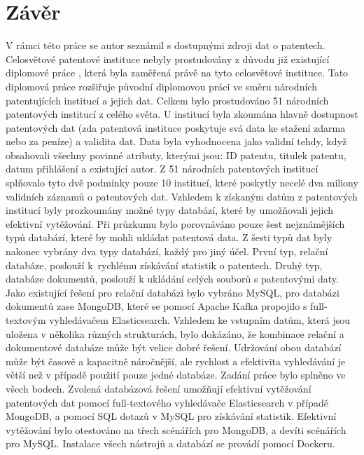 \chapter{Závěr}
V rámci této práce se autor seznámil s dostupnými zdroji dat o patentech. Celosvětové patentové instituce nebyly prostudovány z důvodu již existující diplomové práce \cite{BARATTA2019thesis}, která byla zaměřená právě na tyto celosvětové instituce. Tato diplomová práce rozšiřuje původní diplomovou práci ve směru národních patentujících institucí a jejich dat.
\newline
\indent Celkem bylo prostudováno 51 národních patentových institucí z celého světa. U institucí byla zkoumána hlavně dostupnost patentových dat (zda patentová instituce poskytuje svá data ke stažení zdarma nebo za peníze) a validita dat. Data byla vyhodnocena jako validní tehdy, když obsahovali všechny povinné atributy, kterými jsou: ID patentu, titulek patentu, datum přihlášení a existující autor. Z 51 národních patentových institucí splňovalo tyto dvě podmínky pouze 10 institucí, které poskytly necelé dva miliony validních záznamů o patentových dat.
\newline
\indent Vzhledem k získaným datům z patentových institucí byly prozkoumány možné typy databází, které by umožňovali jejich efektivní vytěžování. Při průzkumu bylo porovnáváno pouze šest nejznámějších typů databází, které by mohli ukládat patentová data. Z šesti typů dat byly nakonec vybrány dva typy databází, každý pro jiný účel. První typ, relační databáze, poslouží k~rychlému získávání statistik o patentech. Druhý typ, databáze dokumentů, poslouží k ukládání celých souborů s patentovými daty. Jako existující řešení pro relační databázi bylo vybráno MySQL, pro databázi dokumentů zase MongoDB, které se pomocí Apache Kafka propojilo s full-textovým vyhledávačem Elasticsearch. Vzhledem ke vstupním datům, která jsou uložena v několika různých strukturách, bylo dokázáno, že kombinace relační a dokumentové databáze může být velice dobré řešení. Udržování obou databází může být časově a kapacitně náročnější, ale rychlost a efektivita vyhledávání je větší než v případě použití pouze jedné databáze.
\newline
\indent Zadání práce bylo splněno ve všech bodech. Zvolená databázová řešení umožňují efektivní vytěžování patentových dat pomocí full-textového vyhledávače Elasticsearch v případě MongoDB, a pomocí \gls{SQL} dotazů v MySQL pro získávání statistik. Efektivní vytěžování bylo otestováno na třech scénářích pro MongoDB, a devíti scénářích pro MySQL. Instalace všech nástrojů a databází se provádí pomocí Dockeru.